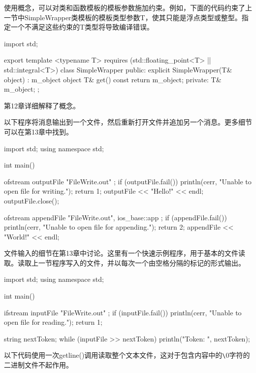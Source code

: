 
使用概念，可以对类和函数模板的模板参数施加约束。例如，下面的代码约束了上一节中SimpleWrapper类模板的模板类型参数T，使其只能是浮点类型或整型。指定一个不满足这些约束的T类型将导致编译错误。

\begin{cpp}
import std;

export template <typename T> requires (std::floating_point<T> || std::integral<T>)
class SimpleWrapper
{
    public:
        explicit SimpleWrapper(T& object) : m_object { object } { }
        T& get() const { return m_object; }
    private:
        T& m_object;
};
\end{cpp}

第12章详细解释了概念。


以下程序将消息输出到一个文件，然后重新打开文件并追加另一个消息。更多细节可以在第13章中找到。

\begin{cpp}
import std;
using namespace std;

int main()
{
    ofstream outputFile { "FileWrite.out" };
    if (outputFile.fail()) {
        println(cerr, "Unable to open file for writing.");
        return 1;
    }
    outputFile << "Hello!" << endl;
    outputFile.close();

    ofstream appendFile { "FileWrite.out", ios_base::app };
    if (appendFile.fail()) {
        println(cerr, "Unable to open file for appending.");
        return 2;
    }
    appendFile << "World!" << endl;
}
\end{cpp}


文件输入的细节在第13章中讨论。这里有一个快速示例程序，用于基本的文件读取。读取上一节程序写入的文件，并以每次一个由空格分隔的标记的形式输出。

\begin{cpp}
import std;
using namespace std;

int main()
{
    ifstream inputFile { "FileWrite.out" };
    if (inputFile.fail()) {
        println(cerr, "Unable to open file for reading.");
        return 1;
    }

    string nextToken;
    while (inputFile >> nextToken) {
        println("Token: {}", nextToken);
    }
}
\end{cpp}

以下代码使用一次getline()调用读取整个文本文件，这对于包含内容中的\verb|\|0字符的二进制文件不起作用。

